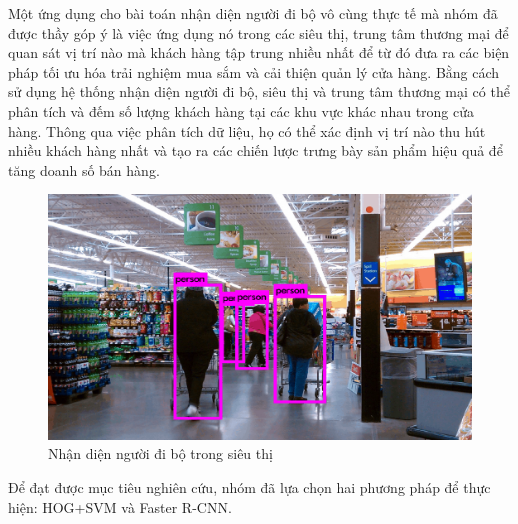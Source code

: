 Một ứng dụng cho bài toán nhận diện người đi bộ vô cùng thực tế mà nhóm đã được thầy góp ý là việc ứng dụng nó trong các siêu thị, trung tâm thương mại để quan sát vị trí nào mà khách hàng tập trung nhiều nhất để từ đó đưa ra các biện pháp tối ưu hóa trải nghiệm mua sắm và cải thiện quản lý cửa hàng. Bằng cách sử dụng hệ thống nhận diện người đi bộ, siêu thị và trung tâm thương mại có thể phân tích và đếm số lượng khách hàng tại các khu vực khác nhau trong cửa hàng. Thông qua việc phân tích dữ liệu, họ có thể xác định vị trí nào thu hút nhiều khách hàng nhất và tạo ra các chiến lược trưng bày sản phẩm hiệu quả để tăng doanh số bán hàng.
\pagebreak
\begin{figure}[h!]
  \centering
  \includegraphics[scale=0.3]{graphics/supermarket.png}
  \caption{Nhận diện người đi bộ trong siêu thị}
\end{figure}

Để đạt được mục tiêu nghiên cứu, nhóm đã lựa chọn hai phương pháp để thực hiện: HOG+SVM và Faster R-CNN.



